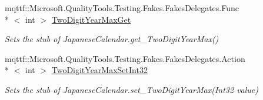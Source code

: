 \begin{DoxyCompactItemize}
mqttf\-::\-Microsoft.\-Quality\-Tools.\-Testing.\-Fakes.\-Fakes\-Delegates.\-Func\\*
$<$ int $>$ \hyperlink{class_system_1_1_globalization_1_1_fakes_1_1_stub_japanese_calendar_aba119ec203024f1c4fdd148d4560acf6}{Two\-Digit\-Year\-Max\-Get}
\begin{DoxyCompactList}\small\item\em Sets the stub of Japanese\-Calendar.\-get\-\_\-\-Two\-Digit\-Year\-Max()\end{DoxyCompactList}\item 
mqttf\-::\-Microsoft.\-Quality\-Tools.\-Testing.\-Fakes.\-Fakes\-Delegates.\-Action\\*
$<$ int $>$ \hyperlink{class_system_1_1_globalization_1_1_fakes_1_1_stub_japanese_calendar_a66d93ad6f9047eb0f6e091fd96402e24}{Two\-Digit\-Year\-Max\-Set\-Int32}
\begin{DoxyCompactList}\small\item\em Sets the stub of Japanese\-Calendar.\-set\-\_\-\-Two\-Digit\-Year\-Max(\-Int32 value)\end{DoxyCompactList}\end{DoxyCompactItemize}

